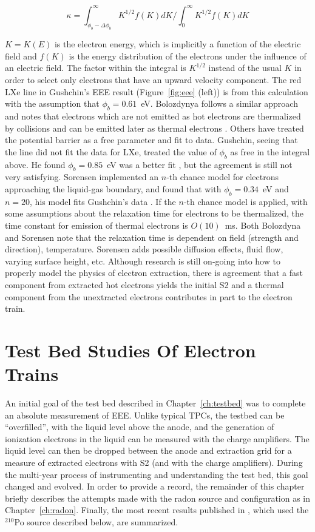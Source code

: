 \begin{equation}
\label{eq:kappa}
\kappa = \int_{\phi_{b} - \Delta\phi_{b}}^\infty K^{1/2} f(K) dK \Big / \int_{0}^{\infty} K^{1/2} f(K)dK
\end{equation}

$K = K(E)$ is the electron energy, which is implicitly a function of the electric field and $f(K)$ is the energy distribution of the electrons under the influence of an electric field. The factor within the integral is $K^{1/2}$ instead of the usual $K$ in order to select only electrons that have an upward velocity component. The red \ac{LXe} line in Gushchin's \ac{EEE} result (Figure~\ref{fig:eee} (left)) is from this calculation with the assumption that $\phi_{b}=0.61$~eV. Bolozdynya follows a similar approach and notes that electrons which are not emitted as hot electrons are thermalized by collisions and can be emitted later as thermal electrons \cite{Bolozdynya1999}. Others have treated the potential barrier as a free parameter and fit to data. Gushchin, seeing that the line did not fit the data for \ac{LXe}, treated the value of $\phi_{b}$ as free in the integral above. He found $\phi_{b}= 0.85$~eV was a better fit \cite{Gushchin1982}, but the agreement is still not very satisfying. Sorensen implemented an $n$-th chance model for electrons approaching the liquid-gas boundary, and found that with $\phi_{b}= 0.34$~eV and $n=20$, his model fits Gushchin's data \cite{Sorensen2017}. If the $n$-th chance model is applied, with some assumptions about the relaxation time for electrons to be thermalized, the time constant for emission of thermal electrons is $O(10)$~ms. Both Bolozdyna and Sorensen note that the relaxation time is dependent on field (strength and direction), temperature. Sorensen adds possible diffusion effects, fluid flow, varying surface height, etc. Although research is still on-going into how to properly model the physics of electron extraction, there is agreement that a fast component from extracted hot electrons yields the initial S2 and a thermal component from the unextracted electrons contributes in part to the electron train.


\section{Test Bed Studies Of Electron Trains}
An initial goal of the test bed described in Chapter~\ref{ch:testbed} was to complete an absolute measurement of \ac{EEE}. Unlike typical \ac{TPC}s, the testbed can be ``overfilled'', with the liquid level above the anode, and the generation of ionization electrons in the liquid can be measured with the charge amplifiers. The liquid level can then be dropped between the anode and extraction grid for a measure of extracted electrons with S2 (and with the charge amplifiers). During the multi-year process of instrumenting and understanding the test bed, this goal changed and evolved. In order to provide a record, the remainder of this chapter briefly describes the attempts made with the radon source and configuration as in Chapter~\ref{ch:radon}. Finally, the most recent results published in \cite{SorensenKamdin2018}, which used the $^{210}$Po source described below, are summarized.

